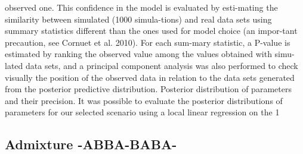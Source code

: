observed one. This confidence in the model is evaluated by esti-mating the similarity between simulated (1000 simula-tions) and real data sets using summary statistics different than the ones used for model choice (an impor-tant precaution, see Cornuet et al. 2010). For each sum-mary statistic, a P-value is estimated by ranking the observed value among the values obtained with simu-lated data sets, and a principal component analysis was also performed to check visually the position of the observed data in relation to the data sets generated from the posterior predictive distribution. Posterior distribution of parameters and their precision. It was possible to evaluate the posterior distributions of parameters for our selected scenario using a local linear regression on the 1%

\subsection{Admixture -ABBA-BABA-}

